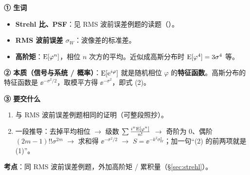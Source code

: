 \label{rd:v-strehl2}
\begin{idea}[读题：概念与要交什么]
\textbf{① 生词}
\begin{itemize}
\item \textbf{Strehl 比、PSF}：见 RMS 波前误差例题的读题（\pageref{rd:v-strehl}）。
\item \textbf{RMS 波前误差 $\sigma_W$}：波像差的标准差。
\item \textbf{高阶矩}：$\mathrm{E}[\varphi^n]$，相位 $n$ 次方的平均。近似成高斯分布时 $\mathrm{E}[\varphi^4]=3\sigma^4$ 等。
\end{itemize}
\textbf{② 本质（信号与系统 / 概率）}：$\mathrm{E}[\mathrm{e}^{i\varphi}]$ 就是随机相位 $\varphi$ 的\textbf{特征函数}。高斯分布的特征函数是 $\ee^{-\sigma^2/2}$，取模平方得 $\ee^{-\sigma^2}$，即式 (2)。

\textbf{③ 要交什么}
\begin{enumerate}[label=\roman*.]
\item 与 RMS 波前误差例题相同的证明（可整段照抄）。
\item 一段推导：去掉平均相位 $\to$ 级数 $\sum\frac{i^n\mathrm{E}[\varphi^n]}{n!}$ $\to$ 奇阶为 0、偶阶 $(2m-1)!!\sigma^{2m}$ $\to$ 求和得 $\ee^{-\sigma^2/2}$ $\to$ $S=\ee^{-k^2\sigma_W^2}$；加一句“(2) 的前两项就是 (1)”。
\end{enumerate}
\end{idea}


\textbf{考点}：同 RMS 波前误差例题，外加高阶矩 / 累积量（§\ref{sec:strehl}）。

